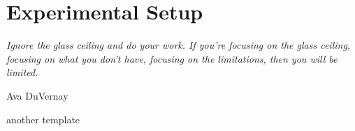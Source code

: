 \chapter{Experimental Setup}
\label{ch:expsetup}

\epigraph{\emph{Ignore the glass ceiling and do your work. If you’re focusing on the glass ceiling,  focusing on what you don’t have, focusing on the limitations, then you will be limited.}}{Ava DuVernay}

another template





